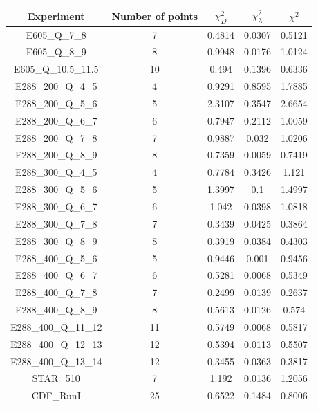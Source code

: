 \documentclass[
]{article}
\begin{document}
\begin{table}[h]

\centering

\begin{tabular}{|c|c|c|c|c|} \hline

\textbf{Experiment} & \textbf{Number of
points} & \textbf{\(\chi_{D}^2\)} & \textbf{\(\chi_{\lambda}^2\)} & \textbf{\(\chi^2\)} \\ \hline

E605\_Q\_7\_8 & 7 & 0.4814 & 0.0307 & 0.5121 \\ \hline
E605\_Q\_8\_9 & 8 & 0.9948 & 0.0176 & 1.0124 \\ \hline
E605\_Q\_10.5\_11.5 & 10 & 0.494 & 0.1396 & 0.6336 \\ \hline
E288\_200\_Q\_4\_5 & 4 & 0.9291 & 0.8595 & 1.7885 \\ \hline
E288\_200\_Q\_5\_6 & 5 & 2.3107 & 0.3547 & 2.6654 \\ \hline
E288\_200\_Q\_6\_7 & 6 & 0.7947 & 0.2112 & 1.0059 \\ \hline
E288\_200\_Q\_7\_8 & 7 & 0.9887 & 0.032 & 1.0206 \\ \hline
E288\_200\_Q\_8\_9 & 8 & 0.7359 & 0.0059 & 0.7419 \\ \hline
E288\_300\_Q\_4\_5 & 4 & 0.7784 & 0.3426 & 1.121 \\ \hline
E288\_300\_Q\_5\_6 & 5 & 1.3997 & 0.1 & 1.4997 \\ \hline
E288\_300\_Q\_6\_7 & 6 & 1.042 & 0.0398 & 1.0818 \\ \hline
E288\_300\_Q\_7\_8 & 7 & 0.3439 & 0.0425 & 0.3864 \\ \hline
E288\_300\_Q\_8\_9 & 8 & 0.3919 & 0.0384 & 0.4303 \\ \hline
E288\_400\_Q\_5\_6 & 5 & 0.9446 & 0.001 & 0.9456 \\ \hline
E288\_400\_Q\_6\_7 & 6 & 0.5281 & 0.0068 & 0.5349 \\ \hline
E288\_400\_Q\_7\_8 & 7 & 0.2499 & 0.0139 & 0.2637 \\ \hline
E288\_400\_Q\_8\_9 & 8 & 0.5613 & 0.0126 & 0.574 \\ \hline
E288\_400\_Q\_11\_12 & 11 & 0.5749 & 0.0068 & 0.5817 \\ \hline
E288\_400\_Q\_12\_13 & 12 & 0.5394 & 0.0113 & 0.5507 \\ \hline
E288\_400\_Q\_13\_14 & 12 & 0.3455 & 0.0363 & 0.3817 \\ \hline
STAR\_510 & 7 & 1.192 & 0.0136 & 1.2056 \\ \hline
CDF\_RunI & 25 & 0.6522 & 0.1484 & 0.8006 \\ \hline

\end{tabular}
\end{table}
\end{document}
